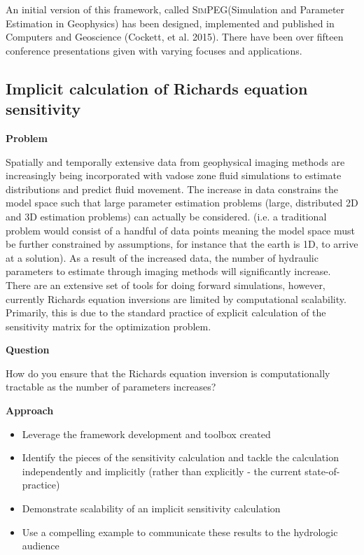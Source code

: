 \documentclass[11pt]{article}
\newcommand{\SimPEG}{\textsc{SimPEG}\xspace}
\begin{document}
An initial version of this framework, called \SimPEG (Simulation and Parameter Estimation in Geophysics) has been designed, implemented and published in Computers and Geoscience (Cockett, et al. 2015). There have been over fifteen conference presentations given with varying focuses and applications.

\subsection{Implicit calculation of Richards equation sensitivity}

\noindent
{\bf Problem}

\noindent
Spatially and temporally extensive data from geophysical imaging methods are increasingly being incorporated with vadose zone fluid simulations to estimate distributions and predict fluid movement. The increase in data constrains the model space such that large parameter estimation problems (large, distributed 2D and 3D estimation problems) can actually be considered. (i.e. a traditional problem would consist of a handful of data points meaning the model space must be further constrained by assumptions, for instance that the earth is 1D, to arrive at a solution). As a result of the increased data, the number of hydraulic parameters to estimate through imaging methods will significantly increase. There are an extensive set of tools for doing forward simulations, however, currently Richards equation inversions are limited by computational scalability. Primarily, this is due to the standard practice of explicit calculation of the sensitivity matrix for the optimization problem.

\noindent
{\bf Question}

\noindent
How do you ensure that the Richards equation inversion is computationally tractable as the number of parameters increases?

\noindent
{\bf Approach}

\noindent
\begin{itemize}
    \item Leverage the framework development and toolbox created
    \item Identify the pieces of the sensitivity calculation and tackle the calculation independently and implicitly (rather than explicitly - the current state-of-practice)
    \item Demonstrate scalability of an implicit sensitivity calculation
    \item Use a compelling example to communicate these results to the hydrologic audience
\end{itemize}
\end{document}
